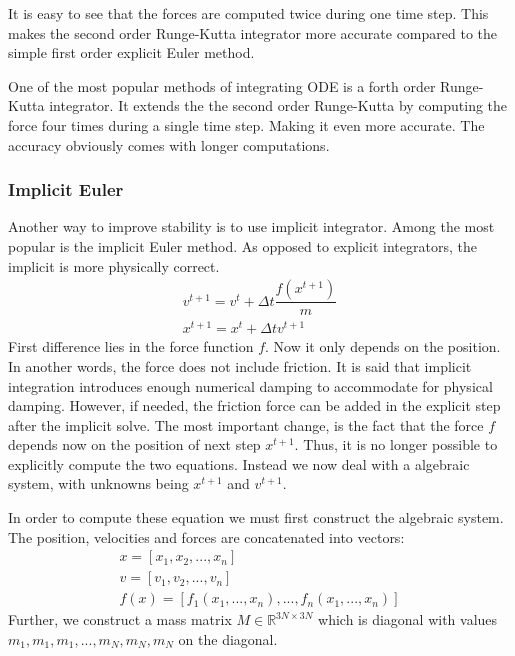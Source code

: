 \documentclass[en]{minipw} %
\begin{document}
It is easy to see that the forces are computed twice during one time step. This makes the second order Runge-Kutta integrator more accurate compared to the simple first order explicit Euler method.

One of the most popular methods of integrating ODE is a forth order Runge-Kutta integrator. It extends the the second order Runge-Kutta by computing the force four times during a single time step. Making it even more accurate. The accuracy obviously comes with longer computations.

\subsubsection{Implicit Euler}
Another way to improve stability is to use implicit integrator. Among the most popular is the implicit Euler method. As opposed to explicit integrators, the implicit is more physically correct.
\begin{equation}
\label{eq:implicit_euler_ode_v}
\begin{aligned}
v^{t+1} = v^{t} + \Delta t \dfrac{f(x^{t+1})}{m}
\\
x^{t+1} = x^{t} + \Delta t v^{t+1}
\end{aligned}
\end{equation}
First difference lies in the force function $f$. Now it only depends on the position. In another words, the force does not include friction. It is said that implicit integration introduces enough numerical damping to accommodate for physical damping. However, if needed, the friction force can be added in the explicit step after the implicit solve. The most important change, is the fact that the force $f$ depends now on the position of next step $x^{t+1}$. Thus, it is no longer possible to explicitly compute the two equations. Instead we now deal with a algebraic system, with unknowns being $x^{t+1}$ and $v^{t+1}$.

In order to compute these equation we must first construct the algebraic system. The position, velocities and forces are concatenated into vectors:
\begin{equation}
\begin{aligned}
x = [x_1, x_2, ..., x_n]
\\
v = [v_1, v_2, ..., v_n]
\\
f(x) = [f_1(x_1,..., x_n), ..., f_n(x_1,..., x_n)]
\end{aligned}
\end{equation}
Further, we construct a mass matrix $M \in \mathbb{R}^{3N \times 3N}$ which is diagonal with values $m_1, m_1, m_1, ..., m_N, m_N, m_N$ on the diagonal.
\end{document}
